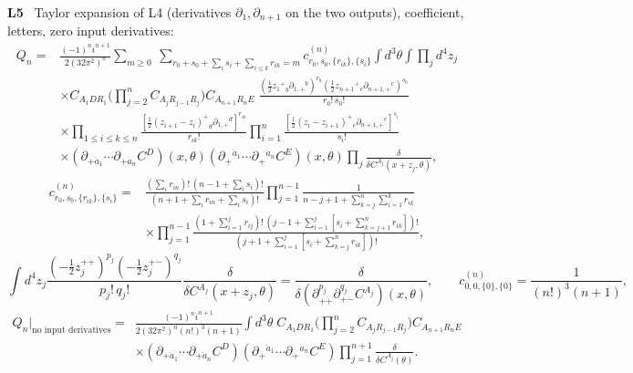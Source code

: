 \documentclass[10pt,a4paper]{article}
\numberwithin{equation}{section}
\newcommand{\dd}[2]{\frac{\delta}{\delta C^{#1}(#2)}}
\newcommand{\LL}[2]{\textsf{L}(#1){\scriptsize\,\texttt{#2}}}
\newcommand{\rid}[1]{\par\medskip\noindent\textbf{#1}\ }
\newcommand{\ptr}[2]{\par\nopagebreak{\footnotesize\raggedleft[\,#1\ $\mid$\ #2\,]\par}}
\newcommand{\st}[1]{\textsf{#1}}
\begin{document}
\rid{L5} Taylor expansion of L4 (derivatives $\partial_{1},\partial_{n+1}$ on the two outputs), coefficient, letters, zero input derivatives:
\begin{equation*}
\begin{aligned}
Q_n={}&\frac{(-1)^ni^{n+1}}{2(32\pi^2)^n}\sum_{m\ge0}\ \sum_{r_0+s_0+\sum_is_i+\sum_{i\le k}r_{ik}=m}c^{(n)}_{r_0,s_0,\{r_{ik}\},\{s_i\}}\int d^3\theta\int\prod_jd^4z_j\\
&\times C_{A_1DR_1}\Big(\prod_{j=2}^nC_{A_jR_{j-1}R_j}\Big)C_{A_{n+1}R_nE}\;
\frac{(\tfrac12z_1{}^+{}_{\dot b}\partial_{1,+}{}^{\dot b})^{r_0}(\tfrac12z_{n+1}{}^+{}_{\dot c}\partial_{n+1,+}{}^{\dot c})^{s_0}}{r_0!\,s_0!}\\
&\times\prod_{1\le i\le k\le n}\frac{[\tfrac12(z_{i+1}-z_i)^+{}_{\dot d}\partial_{1,+}{}^{\dot d}]^{r_{ik}}}{r_{ik}!}
\prod_{i=1}^n\frac{[\tfrac12(z_i-z_{i+1})^+{}_{\dot e}\partial_{n+1,+}{}^{\dot e}]^{s_i}}{s_i!}\\
&\times(\partial_{+\dot a_1}\cdots\partial_{+\dot a_n}C^D)(x,\theta)(\partial_+{}^{\dot a_1}\cdots\partial_+{}^{\dot a_n}C^E)(x,\theta)\prod_j\dd{A_j}{x+z_j,\theta},
\end{aligned}
\end{equation*}
\begin{equation*}
\begin{aligned}
c^{(n)}_{r_0,s_0,\{r_{ik}\},\{s_i\}}={}&\frac{(\sum_ir_{in})!\,(n-1+\sum_is_i)!}{(n+1+\sum_ir_{in}+\sum_is_i)!}\prod_{j=1}^{n-1}\frac1{n-j+1+\sum_{k=j}^n\sum_{i=1}^kr_{ik}}\\
&\times\prod_{j=1}^{n-1}\frac{(1+\sum_{i=1}^jr_{ij})!\,(j-1+\sum_{i=1}^j[s_i+\sum_{k=j+1}^nr_{ik}])!}{(j+1+\sum_{i=1}^j[s_i+\sum_{k=j}^nr_{ik}])!},
\end{aligned}
\end{equation*}
\begin{equation*}
\int d^4z_j\frac{(-\tfrac12z_j^{+\dot+})^{p_j}(-\tfrac12z_j^{+\dot-})^{q_j}}{p_j!\,q_j!}\dd{A_j}{x+z_j,\theta}=\frac{\delta}{\delta(\partial_{+\dot+}^{p_j}\partial_{+\dot-}^{q_j}C^{A_j})(x,\theta)},\qquad c^{(n)}_{0,0,\{0\},\{0\}}=\frac1{(n!)^3(n+1)},
\end{equation*}
\begin{equation*}
\begin{aligned}
Q_n\big|_{\text{no input derivatives}}={}&\frac{(-1)^ni^{n+1}}{2(32\pi^2)^n(n!)^3(n+1)}\int d^3\theta\;C_{A_1DR_1}\Big(\prod_{j=2}^nC_{A_jR_{j-1}R_j}\Big)C_{A_{n+1}R_nE}\\
&\times(\partial_{+\dot a_1}\cdots\partial_{+\dot a_n}C^D)(\partial_+{}^{\dot a_1}\cdots\partial_+{}^{\dot a_n}C^E)\prod_{j=1}^{n+1}\dd{A_j}\theta .
\end{aligned}
\end{equation*}
\ptr{\LL{2.11}{eq-sum-N4-taylor}, \LL{2.12}{eq-sum-N4-coeff}, \LL{2.13}{eq-sum-N4-letters}, \LL{2.14}{eq-sum-Qnzero}$=$\LL{8.4}{eq-Qnzero}; kernel form \LL{5.28}{eq-fan-full-taylor}}{\st{P}; $c^{(n)}_0$ \st{E} $n\le6$}
\end{document}

